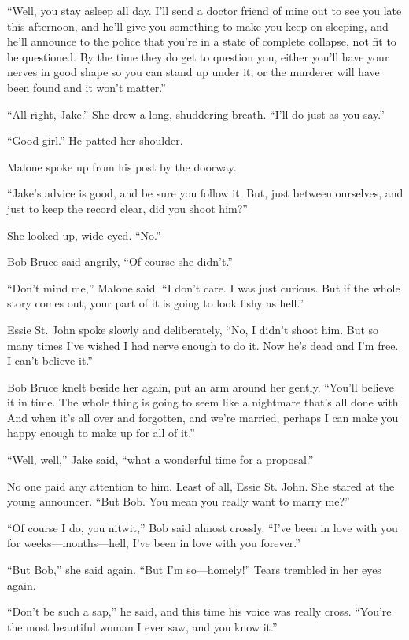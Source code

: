 \documentclass{novel}
\begin{document}
“Well, you stay asleep all day. I’ll send a doctor friend of mine out to see you late this afternoon, and he’ll give you something to make you keep on sleeping, and he’ll announce to the police that you’re in a state of complete collapse, not fit to be questioned. By the time they do get to question you, either you’ll have your nerves in good shape so you can stand up under it, or the murderer will have been found and it won’t matter.”

“All right, Jake.” She drew a long, shuddering breath. “I’ll do just as you say.”

“Good girl.” He patted her shoulder.

Malone spoke up from his post by the doorway.

“Jake’s advice is good, and be sure you follow it. But, just between ourselves, and just to keep the record clear, did you shoot him?”

She looked up, wide-eyed. “No.”

Bob Bruce said angrily, “Of course she didn’t.”

“Don’t mind me,” Malone said. “I don’t care. I was just curious. But if the whole story comes out, your part of it is going to look fishy as hell.”

Essie St. John spoke slowly and deliberately, “No, I didn’t shoot him. But so many times I’ve wished I had nerve enough to do it. Now he’s dead and I’m free. I can’t believe it.”

Bob Bruce knelt beside her again, put an arm around her gently. “You’ll believe it in time. The whole thing is going to seem like a nightmare that’s all done with. And when it’s all over and forgotten, and we’re married, perhaps I can make you happy enough to make up for all of it.”

“Well, well,” Jake said, “what a wonderful time for a proposal.”

No one paid any attention to him. Least of all, Essie St. John. She stared at the young announcer. “But Bob. You mean you really want to marry me?”

“Of course I do, you nitwit,” Bob said almost crossly. “I’ve been in love with you for weeks—months—hell, I’ve been in love with you forever.”

“But Bob,” she said again. “But I’m so—homely!” Tears trembled in her eyes again.

“Don’t be such a sap,” he said, and this time his voice was really cross. “You’re the most beautiful woman I ever saw, and you know it.”
\end{document}
